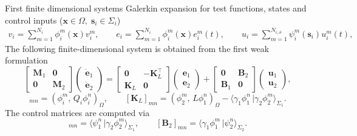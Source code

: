 \documentclass[aspectratio=169]{beamer}
\newcommand{\inner}[3][]{\ensuremath{( #2, \, #3 )_{#1}}}
\newcommand{\dualpr}[3][]{\ensuremath{\langle #2 \, \vert #3 \rangle_{#1}}}
\begin{document}
\begin{frame}{First finite dimensional systems}
Galerkin expansion for test functions, states and control inputs ($\bm{x} \in \Omega, \; \bm{s}_i \in \Sigma_i$)
\begin{equation*}
	\begin{aligned}
		v_i = \sum_{m=1}^{N_i} \phi_i^m(\bm{x}) v_i^m, \qquad e_i = \sum_{m=1}^{N_i} \phi_i^m(\bm{x}) e_i^m(t), \qquad u_i = \sum_{m=1}^{N_{i, \partial}} \psi_i^m(\bm{s}_i) u_i^m(t),
	\end{aligned}
\end{equation*}
The following finite-dimensional system is obtained from the first weak formulation 
\begin{equation*}
	\begin{bmatrix}
		\mathbf{M}_1 & \mathbf{0} \\
		\mathbf{0} & \mathbf{M}_2
	\end{bmatrix} \begin{pmatrix}
		\dot{\mathbf{e}}_1 \\
		\dot{\mathbf{e}}_2
	\end{pmatrix} = \begin{bmatrix}
		\mathbf{0} & -\mathbf{K}_{L}^\top \\
		\mathbf{K}_{L} & \mathbf{0}
	\end{bmatrix} \begin{pmatrix}
		\mathbf{e}_1 \\
		\mathbf{e}_2
	\end{pmatrix} + 
	\begin{bmatrix}
		\mathbf{0} & \mathbf{B}_{2} \\
		\mathbf{B}_{1} & \mathbf{0}
	\end{bmatrix} \begin{pmatrix}
		\mathbf{u}_1 \\
		\mathbf{u}_2
	\end{pmatrix},
\end{equation*}
\begin{equation*}
	[\mathbf{M}_i]_{mn} = \inner[\Omega]{\phi_i^m}{Q_i \phi_i^n}, \qquad 	[\mathbf{K}_{L}]_{mn} = \inner[\Omega]{\phi_2^m}{L \phi_1^n} - \dualpr[\Sigma_1]{\gamma_1 \phi_1^n}{\gamma_2 \phi_2^m}.
\end{equation*}
The control matrices are computed via
\begin{equation*}
	[\mathbf{B}_{1}]_{mn} = \dualpr[\Sigma_1]{\psi_1^n}{\gamma_2\phi_2^m}, \qquad [\mathbf{B}_{2}]_{mn} = \dualpr[\Sigma_2]{\gamma_1\phi_1^m}{\psi_2^n}.
\end{equation*}

\end{frame}
\end{document}
